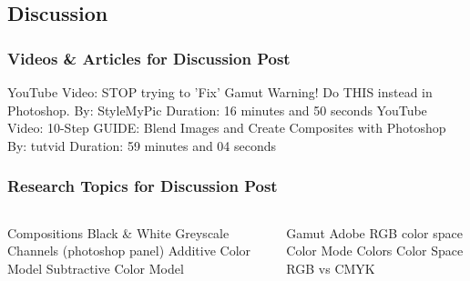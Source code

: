 \documentclass{beamer}
\begin{document}
			\subsection{Discussion}		
				\begin{frame}
					\frametitle{Videos \& Articles for Discussion Post}
					\begin{outline}
						\1 YouTube Video:  STOP trying to 'Fix' Gamut Warning! Do THIS instead in Photoshop.
							\2 By:          StyleMyPic
							\2 Duration:     16 minutes and 50 seconds
						\1 YouTube Video:  10-Step GUIDE: Blend Images and Create Composites with Photoshop
							\2 By:          tutvid
							\2 Duration:  59 minutes and 04 seconds
					\end{outline}
					
				\end{frame}

				\begin{frame}
					\frametitle{Research Topics for Discussion Post}
					\begin{columns}
						\column{.5\textwidth}
						\begin{outline}
							\1 Compositions
							\1 Black \& White
							\1 Greyscale
							\1 Channels (photoshop panel)
							\1 Additive Color Model
							\1 Subtractive Color Model

						\end{outline}
						\column{.5\textwidth}
					\begin{outline}
							\1 Gamut
						\1 Adobe RGB color space
						\1 Color Mode
						\1 Colors
						\1 Color Space
						\1 RGB vs CMYK
					\end{outline}
					\end{columns}
				\end{frame}
	
	\section{}	
\end{document}
